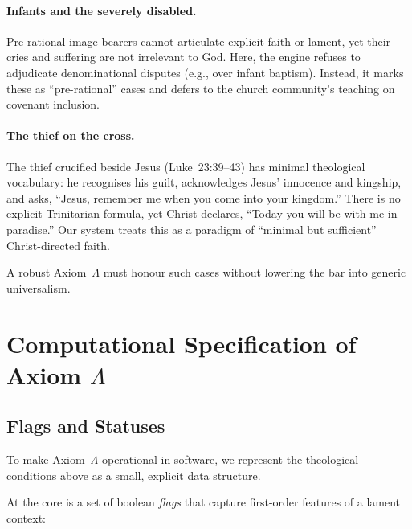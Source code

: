 \documentclass[11pt]{article}
\begin{document}
\paragraph{Infants and the severely disabled.} Pre-rational image-bearers cannot articulate explicit faith or lament, yet their cries and suffering are not irrelevant to God. Here, the engine refuses to adjudicate denominational disputes (e.g., over infant baptism). Instead, it marks these as ``pre-rational'' cases and defers to the church community's teaching on covenant inclusion.

\paragraph{The thief on the cross.} The thief crucified beside Jesus (Luke~23:39--43) has minimal theological vocabulary: he recognises his guilt, acknowledges Jesus' innocence and kingship, and asks, ``Jesus, remember me when you come into your kingdom.'' There is no explicit Trinitarian formula, yet Christ declares, ``Today you will be with me in paradise.'' Our system treats this as a paradigm of ``minimal but sufficient'' Christ-directed faith.

A robust Axiom~$\Lambda$ must honour such cases without lowering the bar into generic universalism.

\section{Computational Specification of Axiom $\Lambda$}

\subsection{Flags and Statuses}

To make Axiom~$\Lambda$ operational in software, we represent the theological conditions above as a small, explicit data structure.

At the core is a set of boolean \emph{flags} that capture first-order features of a lament context:
\end{document}
